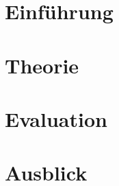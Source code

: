 \documentclass[12pt,ngerman,project]{dbvstudentwork}
\begin{document}
	
	\begin{dbvstudentworkTitlepage}
		
		
		
		
		\Deadline{\today}
		
		
	\end{dbvstudentworkTitlepage}
	
	\tableofcontents
	\clearpage
	
	
	\section{Einführung}
	\label{sec:introduction}
		
		
	\section{Theorie}
	\label{sec:theorie}
		
		
	\section{Evaluation}
	\label{sec:evaluation}
		
		
	\section{Ausblick}
	\label{sec:lessonslearned}
		

	
	\singlespacing
	
	\clearpage
	
	\clearpage
	\listoffigures %
	\clearpage
	
\end{document}
